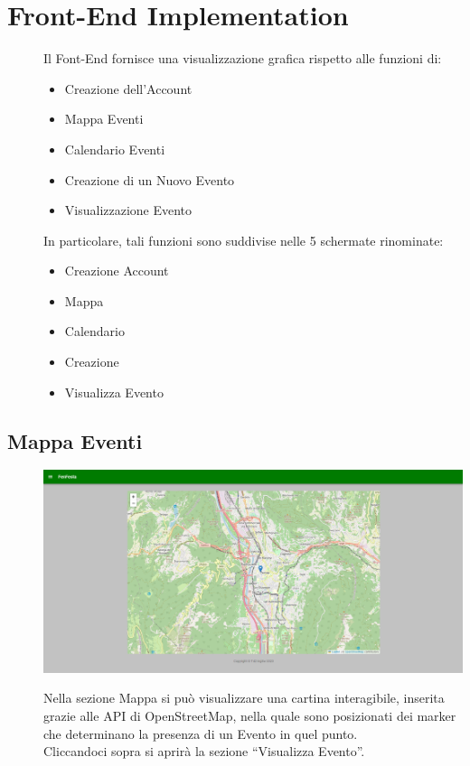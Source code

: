\documentclass{article}
\begin{document}
\section{Front-End Implementation}
\begin{description}
    \item[] Il Font-End fornisce una visualizzazione grafica rispetto alle funzioni di:
        \begin{itemize}
            \item Creazione dell'Account
            \item Mappa Eventi
            \item Calendario Eventi
            \item Creazione di un Nuovo Evento
            \item Visualizzazione Evento
        \end{itemize}
    \item[] In particolare, tali funzioni sono suddivise nelle 5 schermate rinominate:
        \begin{itemize}
            \item Creazione Account
            \item Mappa
            \item Calendario
            \item Creazione
            \item Visualizza Evento
        \end{itemize}
\end{description}
\clearpage
\subsection{Mappa Eventi}
\begin{description}
    \item[] \begin{center}
            \includegraphics[scale=0.3]{Mappa_Eventi.png}
        \end{center}
    \item[] Nella sezione Mappa si può visualizzare una cartina interagibile, inserita grazie alle API di OpenStreetMap, nella quale sono posizionati dei marker che determinano la presenza di un Evento in quel punto. \\ Cliccandoci sopra si aprirà la sezione “Visualizza Evento”.
\end{description}
\end{document}
